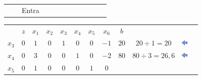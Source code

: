 \begin{frame}
{\begin{table}
\begin{tabular}{c c c c c c c c c c c c}
				& & Entra \\
			\end{tabular}
		\end{table}	
	}	
	{
		\begin{table}
			\begin{tabular}{c c c c c c c c c c c c}
				& \cellcolor{blue!80} \color{white} $ \scriptstyle z$
				& \cellcolor{blue!80} \color{white} $ \scriptstyle x_1$ 
				& \cellcolor{blue!80} \color{red} $ \scriptstyle x_2$
				& \cellcolor{blue!80} \color{red} $ \scriptstyle x_3$
				& \cellcolor{blue!80} \color{red} $ \scriptstyle x_4$
				& \cellcolor{blue!80} \color{red} $ \scriptstyle x_5$
				& \cellcolor{blue!80} \color{white} $ \scriptstyle x_6$ 
				& \cellcolor{blue!80} \color{white} $ \scriptstyle b$ \\
				\cellcolor{blue!80} \color{red} $ \scriptstyle x_3$
				& \cellcolor{yellow!60}  $ \scriptstyle 0$
				& \cellcolor{gray!60}  $ \scriptstyle 1$ 
				& \cellcolor{yellow!60}  $ \scriptstyle 0$
				& \cellcolor{yellow!60}  $ \scriptstyle 1$
				& \cellcolor{yellow!60}  $ \scriptstyle 0$
				& \cellcolor{yellow!60}  $ \scriptstyle 0$
				& \cellcolor{yellow!60}  $ \scriptstyle -1$ 
				& \cellcolor{gray!60}  $ \scriptstyle 20$
				& $ \scriptstyle 20 \div 1 = 20$ 
				& \includegraphics[width=0.3cm,height=0.3cm]{setaesquerda.jpg}\\ 
				\cellcolor{blue!80} \color{red} $ \scriptstyle x_4$
				& \cellcolor{yellow!60}  $ \scriptstyle 0$
				& \cellcolor{gray!60}  $ \scriptstyle 3$ 
				& \cellcolor{yellow!60}  $ \scriptstyle 0$
				& \cellcolor{yellow!60}  $ \scriptstyle 0$
				& \cellcolor{yellow!60}  $ \scriptstyle 1$
				& \cellcolor{yellow!60}  $ \scriptstyle 0$
				& \cellcolor{yellow!60}  $ \scriptstyle -2$ 
				& \cellcolor{gray!60}  $ \scriptstyle 80$ 
				& $ \scriptstyle 80 \div 3 = 26,6$
				& \includegraphics[width=0.3cm,height=0.3cm]{setaesquerda.jpg}\\ 
				\cellcolor{blue!80} \color{red} $ \scriptstyle x_5$  
				& \cellcolor{yellow!60}  $ \scriptstyle 0$
				& \cellcolor{gray!60}  $ \scriptstyle 1$ 
				& \cellcolor{yellow!60}  $ \scriptstyle 0$
				& \cellcolor{yellow!60}  $ \scriptstyle 0$
				& \cellcolor{yellow!60}  $ \scriptstyle 0$
				& \cellcolor{yellow!60}  $ \scriptstyle 1$
				& \cellcolor{yellow!60}  $ \scriptstyle 0$ 

\end{tabular}
\end{table}}
\end{frame}
